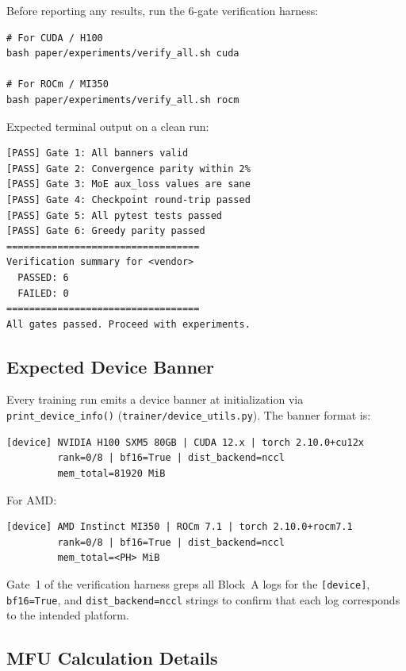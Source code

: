 Before reporting any results, run the 6-gate verification harness:

\begin{verbatim}
# For CUDA / H100
bash paper/experiments/verify_all.sh cuda

# For ROCm / MI350
bash paper/experiments/verify_all.sh rocm
\end{verbatim}

Expected terminal output on a clean run:

\begin{verbatim}
[PASS] Gate 1: All banners valid
[PASS] Gate 2: Convergence parity within 2%
[PASS] Gate 3: MoE aux_loss values are sane
[PASS] Gate 4: Checkpoint round-trip passed
[PASS] Gate 5: All pytest tests passed
[PASS] Gate 6: Greedy parity passed
==================================
Verification summary for <vendor>
  PASSED: 6
  FAILED: 0
==================================
All gates passed. Proceed with experiments.
\end{verbatim}

\subsection{Expected Device Banner}
\label{sec:appendix:banner}

Every training run emits a device banner at initialization via
\texttt{print\_device\_info()} (\texttt{trainer/device\_utils.py}).
The banner format is:

\begin{verbatim}
[device] NVIDIA H100 SXM5 80GB | CUDA 12.x | torch 2.10.0+cu12x
         rank=0/8 | bf16=True | dist_backend=nccl
         mem_total=81920 MiB
\end{verbatim}

For AMD:

\begin{verbatim}
[device] AMD Instinct MI350 | ROCm 7.1 | torch 2.10.0+rocm7.1
         rank=0/8 | bf16=True | dist_backend=nccl
         mem_total=<PH> MiB
\end{verbatim}

Gate~1 of the verification harness greps all Block~A logs for the
\texttt{[device]}, \texttt{bf16=True}, and \texttt{dist\_backend=nccl}
strings to confirm that each log corresponds to the intended platform.

\subsection{MFU Calculation Details}
\label{sec:appendix:mfu}

